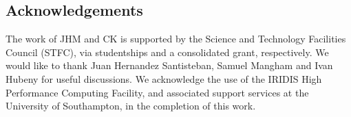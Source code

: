 \documentclass[preprint, a4paper, 11pt]{aastex}
\begin{document}









\subsection*{Acknowledgements}
The work of JHM and CK is supported by the Science and Technology Facilities Council (STFC), 
via studentships and a consolidated grant, respectively. We would like to thank Juan Hernandez Santisteban, Samuel Mangham and Ivan Hubeny for useful discussions. 
We acknowledge the use of the IRIDIS High Performance Computing Facility, 
and associated support services at the University of Southampton, in the completion of this work.



\end{document}
